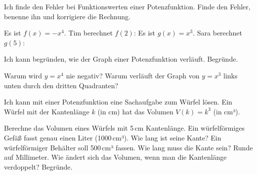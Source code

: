 \begin{aufgabe}{Ich finde den Fehler bei Funktionswerten einer Potenzfunktion.}
Finde den Fehler, benenne ihn und korrigiere die Rechnung.
\begin{teile}
\teil Es ist $f(x) = -x^4$. Tim berechnet $f(2)$:
\teil Es ist $g(x) = x^3$. Sara berechnet $g(5)$:
\end{teile}
\end{aufgabe}

\begin{aufgabe}{Ich kann begründen, wie der Graph einer Potenzfunktion verläuft.}
Begründe.
\begin{teile}
\teil Warum wird $y = x^4$ nie negativ?
\teil Warum verläuft der Graph von $y = x^3$ links unten durch den dritten Quadranten?
\end{teile}
\end{aufgabe}

\begin{aufgabe}{Ich kann mit einer Potenzfunktion eine Sachaufgabe zum Würfel lösen.}
Ein Würfel mit der Kantenlänge $k$ (in cm) hat das Volumen $V(k) = k^3$ (in cm³).
\begin{teile}
\teil Berechne das Volumen eines Würfels mit 5\,cm Kantenlänge.
\teil Ein würfelförmiges Gefäß fasst genau einen Liter (1000\,cm³). Wie lang ist seine Kante?
\teil Ein würfelförmiger Behälter soll 500\,cm³ fassen. Wie lang muss die Kante sein? Runde auf Millimeter.
\teil Wie ändert sich das Volumen, wenn man die Kantenlänge verdoppelt? Begründe.
\end{teile}
\end{aufgabe}
